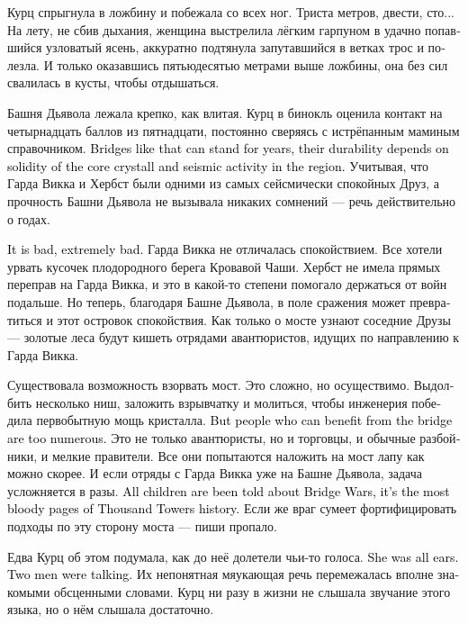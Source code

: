 \documentclass[a4paper,12pt,fleqn]{book}\usepackage{cooltooltips}\usepackage{polyglossia}\setdefaultlanguage[babelshorthands=true]{russian}\setotherlanguage{english}\defaultfontfeatures{Ligatures=TeX,Mapping=tex-text} \usepackage{xcolor}\definecolor{lightgray}{HTML}{bbbbbb}\color{lightgray}\newcommand{\ml}[3]{\textenglish{\textcolor{black}{#3}}}
\begin{document}
Курц спрыгнула в ложбину и побежала со всех ног.
Триста метров, двести, сто...
На лету, не сбив дыхания, женщина выстрелила лёгким гарпуном в удачно попавшийся узловатый ясень, аккуратно подтянула запутавшийся в ветках трос и полезла.
И только оказавшись пятьюдесятью метрами выше ложбины, она без сил свалилась в кусты, чтобы отдышаться.

Башня Дьявола лежала крепко, как влитая.
Курц в бинокль оценила контакт на четырнадцать баллов из пятнадцати, постоянно сверяясь с истрёпанным маминым справочником.
\ml{$0$}
{Такие мосты могут стоять годами, их долговечность зависит исключительно от прочности корневого кристалла Башни и сейсмической активности региона.}
{Bridges like that can stand for years, their durability depends on solidity of the core crystall and seismic activity in the region.}
Учитывая, что Гарда Викка и Хербст были одними из самых сейсмически спокойных Друз, а прочность Башни Дьявола не вызывала никаких сомнений --- речь действительно о годах.

\ml{$0$}
{Это плохо, очень плохо.}
{It is bad, extremely bad.}
Гарда Викка не отличалась спокойствием.
Все хотели урвать кусочек плодородного берега Кровавой Чаши.
Хербст не имела прямых переправ на Гарда Викка, и это в какой-то степени помогало держаться от войн подальше.
Но теперь, благодаря Башне Дьявола, в поле сражения может превратиться и этот островок спокойствия.
Как только о мосте узнают соседние Друзы --- золотые леса будут кишеть отрядами авантюристов, идущих по направлению к Гарда Викка.

Существовала возможность взорвать мост.
Это сложно, но осуществимо.
Выдолбить несколько ниш, заложить взрывчатку и молиться, чтобы инженерия победила первобытную мощь кристалла.
\ml{$0$}
{Но тех, кому выгоден мост, чересчур много.}
{But people who can benefit from the bridge are too numerous.}
Это не только авантюристы, но и торговцы, и обычные разбойники, и мелкие правители.
Все они попытаются наложить на мост лапу как можно скорее.
И если отряды с Гарда Викка уже на Башне Дьявола, задача усложняется в разы.
\ml{$0$}
{Про Войны Мостов рассказывали всем детям, это самые кровавые страницы в истории Тысячи Башен.}
{All children are been told about Bridge Wars, it's the most bloody pages of Thousand Towers history.}
Если же враг сумеет фортифицировать подходы по эту сторону моста --- пиши пропало.

Едва Курц об этом подумала, как до неё долетели чьи-то голоса.
\ml{$0$}
{Она обратилась в слух.}
{She was all ears.}
\ml{$0$}
{Говорили двое мужчин.}
{Two men were talking.}
Их непонятная мяукающая речь перемежалась вполне знакомыми обсценными словами.
Курц ни разу в жизни не слышала звучание этого языка, но о нём слышала достаточно.
\end{document}
